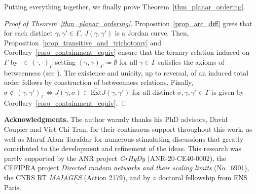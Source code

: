 \documentclass[a4paper, 11pt]{article} %
\theoremstyle{plain}
\newcommand{\clExt}{\overline{\mathrm{Ext}}}
\newcommand{\1}{\mathds 1}
\numberwithin{equation}{section}
\begin{document}
Putting everything together, we finally prove Theorem~\ref{thm_planar_ordering}.


\begin{proof}[Proof of Theorem~\ref{thm_planar_ordering}]
    Proposition~\ref{prop_arc_diff} gives that for each distinct $\gamma,\gamma'\in\Gamma$, $J(\gamma,\gamma')$ is a Jordan curve. Then, Proposition~\ref{prop_transitive_and_trichotomy} and Corollary~\ref{coro_containment_equiv} ensure that the ternary relation induced on $\Gamma$ by $\cdot\in(\cdot,\cdot)_\Gamma$ setting $(\gamma,\gamma)_\Gamma\coloneq\emptyset$ for all $\gamma\in\Gamma$ satisfies the axioms of betweenness (see \cite{betweenness}). The existence and unicity, up to reversal, of an induced total order follows by construction of betweenness relations. Finally, $\sigma\notin(\gamma,\gamma')_\Gamma\iff J(\gamma,\sigma)\subset\clExt J(\gamma,\gamma')$ for all distinct $\sigma,\gamma,\gamma'\in\Gamma$ is given by Corollary~\ref{coro_containment_equiv}.
\end{proof}


\noindent\textbf{Acknowledgments.} The author warmly thanks his PhD advisors, David Coupier and Viet Chi Tran, for their continuous support throughout this work, as well as Maruf Alam Tarafdar for numerous stimulating discussions that greatly contributed to the development and refinement of the ideas. This research was partly supported by the ANR project \emph{GrHyDy} (ANR-20-CE40-0002), the CEFIPRA project \emph{Directed random networks and their scaling limits} (No.\ 6901), the CNRS RT \emph{MAIAGES} (Action 2179), and by a doctoral fellowship from ENS Paris.




\end{document}
